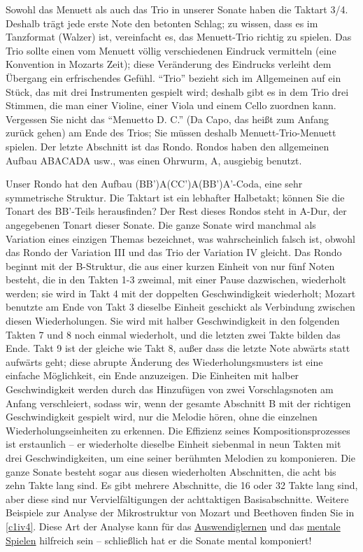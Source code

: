 Sowohl das Menuett als auch das Trio in unserer Sonate haben die Taktart 3/4.
Deshalb trägt jede erste Note den betonten Schlag; zu wissen, dass es im Tanzformat (Walzer) ist, vereinfacht es, das Menuett-Trio richtig zu spielen.
Das Trio sollte einen vom Menuett völlig verschiedenen Eindruck vermitteln (eine Konvention in Mozarts Zeit); diese Veränderung des Eindrucks verleiht dem Übergang ein erfrischendes Gefühl.
\enquote{Trio} bezieht sich im Allgemeinen auf ein Stück, das mit drei Instrumenten gespielt wird; deshalb gibt es in dem Trio drei Stimmen, die man einer Violine, einer Viola und einem Cello zuordnen kann.
Vergessen Sie nicht das \enquote{Menuetto D. C.} (Da Capo, das heißt zum Anfang zurück gehen) am Ende des Trios; Sie müssen deshalb Menuett-Trio-Menuett spielen.
Der letzte Abschnitt ist das Rondo.
Rondos haben den allgemeinen Aufbau ABACADA usw., was einen Ohrwurm, A, ausgiebig benutzt.


Unser Rondo hat den Aufbau (BB')A(CC')A(BB')A'-Coda, eine sehr symmetrische Struktur.
Die Taktart ist ein lebhafter Halbetakt; können Sie die Tonart des BB'-Teils herausfinden?
Der Rest dieses Rondos steht in A-Dur, der angegebenen Tonart dieser Sonate.
Die ganze Sonate wird manchmal als Variation eines einzigen Themas bezeichnet, was wahrscheinlich falsch ist, obwohl das Rondo 
der Variation III und das Trio der Variation IV gleicht.
Das Rondo beginnt mit der B-Struktur, die aus einer kurzen Einheit von nur fünf Noten besteht, die in den Takten 1-3 zweimal, mit einer Pause dazwischen, wiederholt werden; sie wird in Takt 4 mit der doppelten Geschwindigkeit wiederholt; Mozart benutzte am Ende von Takt 3 dieselbe Einheit geschickt als Verbindung zwischen diesen Wiederholungen.
Sie wird mit halber Geschwindigkeit in den folgenden Takten 7 und 8 noch einmal wiederholt, und die letzten zwei Takte bilden das Ende.
Takt 9 ist der gleiche wie Takt 8, außer dass die letzte Note abwärts statt aufwärts geht; diese abrupte Änderung des Wiederholungsmusters ist eine einfache Möglichkeit, ein Ende anzuzeigen.
Die Einheiten mit halber Geschwindigkeit werden durch das Hinzufügen von zwei Vorschlagsnoten am Anfang verschleiert, sodass wir, wenn der gesamte Abschnitt B mit der richtigen Geschwindigkeit gespielt wird, nur die Melodie hören, ohne die einzelnen Wiederholungseinheiten zu erkennen.
Die Effizienz seines Kompositionsprozesses ist erstaunlich -- er wiederholte dieselbe Einheit siebenmal in neun Takten mit drei Geschwindigkeiten, um eine seiner berühmten Melodien zu komponieren.
Die ganze Sonate besteht sogar aus diesen wiederholten Abschnitten, die acht bis zehn Takte lang sind.
Es gibt mehrere Abschnitte, die 16 oder 32 Takte lang sind, aber diese sind nur Vervielfältigungen der achttaktigen Basisabschnitte.
Weitere Beispiele zur Analyse der Mikrostruktur von Mozart und Beethoven finden Sie in \hyperref[c1iv4]{\autoref{c1iv4}}.
Diese Art der Analyse kann für das \hyperref[c1iii6]{Auswendiglernen} und das \hyperref[c1ii12mental]{mentale Spielen} hilfreich sein -- schließlich hat er die Sonate mental komponiert!

